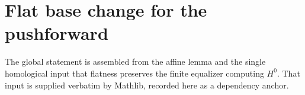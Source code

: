 \section{Flat base change for the pushforward}

The global statement is assembled from the affine lemma and the single homological
input that flatness preserves the finite equalizer computing \(H^0\). That input is
supplied verbatim by Mathlib, recorded here as a dependency anchor.




